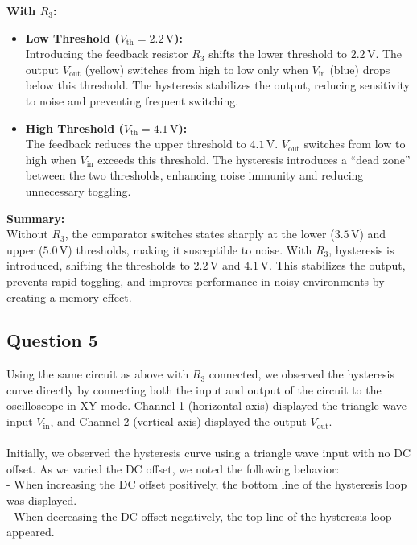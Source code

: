 \documentclass{article}
\begin{document}
\textbf{With \( R_3 \):}

\begin{itemize}
    \item \textbf{Low Threshold (\( V_{\text{th}} = 2.2\,\text{V} \)):} \\
    Introducing the feedback resistor \( R_3 \) shifts the lower threshold to \( 2.2\,\text{V} \). The output \( V_{\text{out}} \) (yellow) switches from high to low only when \( V_{\text{in}} \) (blue) drops below this threshold. The hysteresis stabilizes the output, reducing sensitivity to noise and preventing frequent switching.
    
    \item \textbf{High Threshold (\( V_{\text{th}} = 4.1\,\text{V} \)):} \\
    The feedback reduces the upper threshold to \( 4.1\,\text{V} \). \( V_{\text{out}} \) switches from low to high when \( V_{\text{in}} \) exceeds this threshold. The hysteresis introduces a “dead zone” between the two thresholds, enhancing noise immunity and reducing unnecessary toggling.
\end{itemize}

\textbf{Summary:} \\
Without \( R_3 \), the comparator switches states sharply at the lower (\( 3.5\,\text{V} \)) and upper (\( 5.0\,\text{V} \)) thresholds, making it susceptible to noise. With \( R_3 \), hysteresis is introduced, shifting the thresholds to \( 2.2\,\text{V} \) and \( 4.1\,\text{V} \). This stabilizes the output, prevents rapid toggling, and improves performance in noisy environments by creating a memory effect.

\subsection*{Question 5}
Using the same circuit as above with \( R_3 \) connected, we observed the hysteresis curve directly by connecting both the input and output of the circuit to the oscilloscope in XY mode. Channel 1 (horizontal axis) displayed the triangle wave input \( V_{\text{in}} \), and Channel 2 (vertical axis) displayed the output \( V_{\text{out}} \).
\\
\\
Initially, we observed the hysteresis curve using a triangle wave input with no DC offset. As we varied the DC offset, we noted the following behavior: \\ 
- When increasing the DC offset positively, the bottom line of the hysteresis loop was displayed. \\
- When decreasing the DC offset negatively, the top line of the hysteresis loop appeared. \\
\end{document}
